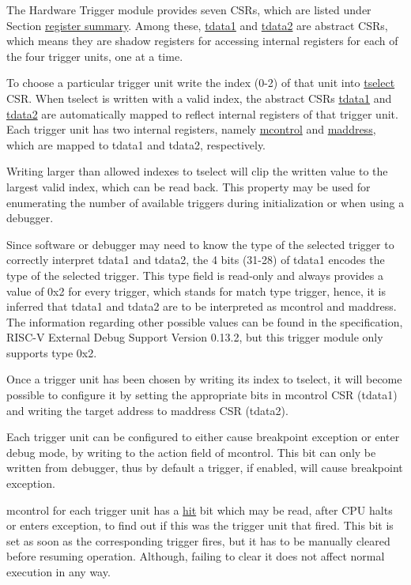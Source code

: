 \documentclass[main\_\_EN.tex]{subfiles}
\begin{document}
The Hardware Trigger module provides seven CSRs, which are listed under Section \hyperref[sec:riscvcpu-hwt-reg-summ]{register summary}. Among these, \hyperref[regdesc:TDATA1]{tdata1} and \hyperref[regdesc:TDATA2]{tdata2} are abstract CSRs, which means they are shadow registers for accessing internal registers for each of the four trigger units, one at a time.

To choose a particular trigger unit write the index (0-2) of that unit into \hyperref[regdesc:TSELECT]{tselect} CSR. When tselect is written with a valid index, the abstract CSRs \hyperref[regdesc:TDATA1]{tdata1} and \hyperref[regdesc:TDATA2]{tdata2} are automatically mapped to reflect internal registers of that trigger unit. Each trigger unit has two internal registers, namely \hyperref[regdesc:MCONTROL]{mcontrol} and \hyperref[regdesc:MADDRESS]{maddress}, which are mapped to tdata1 and tdata2, respectively.

Writing larger than allowed indexes to tselect will clip the written value to the largest valid index, which can be read back. This property may be used for enumerating the number of available triggers during initialization or when using a debugger.

Since software or debugger may need to know the type of the selected trigger to correctly interpret tdata1 and tdata2, the 4 bits (31-28) of tdata1 encodes the type of the selected trigger. This type field is read-only and always provides a value of 0x2 for every trigger, which stands for match type trigger, hence, it is inferred that tdata1 and tdata2 are to be interpreted as mcontrol and maddress. The information regarding other possible values can be found in the specification, RISC-V External Debug Support Version 0.13.2, but this trigger module only supports type 0x2.

Once a trigger unit has been chosen by writing its index to tselect, it will become possible to configure it by setting the appropriate bits in mcontrol CSR (tdata1) and writing the target address to maddress CSR (tdata2).

Each trigger unit can be configured to either cause breakpoint exception or enter debug mode, by writing to the action field of mcontrol. This bit can only be written from debugger, thus by default a trigger, if enabled, will cause breakpoint exception.

mcontrol for each trigger unit has a \hyperref[fielddesc:MCONTROLHIT]{hit} bit which may be read, after CPU halts or enters exception, to find out if this was the trigger unit that fired. This bit is set as soon as the corresponding trigger fires, but it has to be manually cleared before resuming operation. Although, failing to clear it does not affect normal execution in any way.
\end{document}
